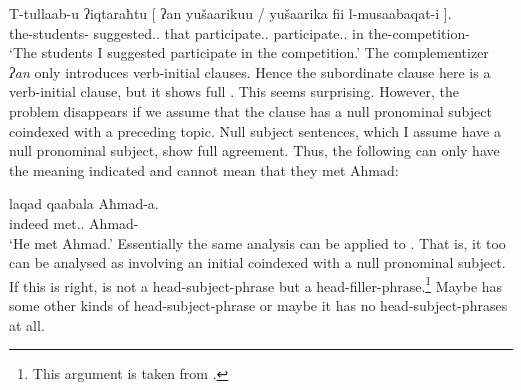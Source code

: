 \documentclass[output=paper]{langsci/langscibook}
\begin{document}
\ea\label{ex:key:4.28}
    \sn\gll T-tullaab-u ʔiqtaraħtu {[} ʔan yušaarikuu {/ } \llap{*}yušaarika fii l-musaabaqat-i ].\\
            the-students-\Nom{} suggested.\Fsg.\M{} {} that participate.\Tpl.\M{} {} participate.\Tsg.\M{} in the-competition-\Gen{}\\
    \glt    \enquote*{The students I suggested participate in the competition.}
\z
%
The complementizer \emph{ʔan} only introduces verb-initial clauses. Hence the
subordinate clause here is a verb-initial clause, but it shows full
.  This seems surprising. However, the problem disappears if we
assume that the clause has a null pronominal subject coindexed with a preceding
topic. Null subject sentences, which I assume have a null pronominal subject,
show full agreement. Thus, the following can only have the meaning indicated
and cannot mean that they met Ahmad:

\ea\label{ex:key:4.29}
    \sn\gll laqad    qaabala    Aħmad-a.\\
            indeed met.\Tsg.\M{} Ahmad-\Acc{}\\
    \glt    \enquote*{He met Ahmad.}
\z
%
Essentially the same analysis can be applied to . That is, it
too can be analysed as involving an initial  coindexed with a null
pronominal subject. If this is right,  is not a
head-subject-phrase but a head-filler-phrase.\footnote{ \textrm{This argument
is taken from \citet{AloBor2013}.}} Maybe  has some other kinds of
head-subject-phrase or maybe it has no head-subject-phrases at all.
\end{document}
